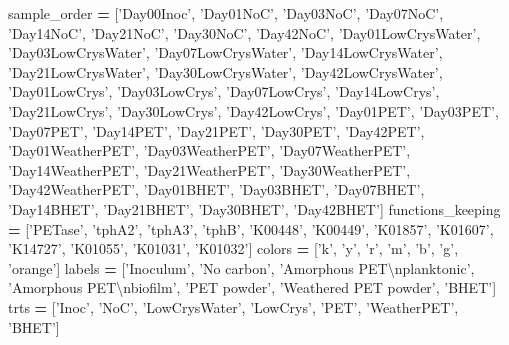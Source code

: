 \documentclass[
]{article}
\newenvironment{Shaded}{\begin{snugshade}}{\end{snugshade}}
\newcommand{\CharTok}[1]{\textcolor[rgb]{0.31,0.60,0.02}{#1}}
\newcommand{\NormalTok}[1]{#1}
\newcommand{\OperatorTok}[1]{\textcolor[rgb]{0.81,0.36,0.00}{\textbf{#1}}}
\newcommand{\StringTok}[1]{\textcolor[rgb]{0.31,0.60,0.02}{#1}}
\begin{document}
\begin{Shaded}
\begin{Highlighting}[]
\NormalTok{sample_order }\OperatorTok{=}\NormalTok{ [}\StringTok{'Day00Inoc'}\NormalTok{, }\StringTok{'Day01NoC'}\NormalTok{, }\StringTok{'Day03NoC'}\NormalTok{, }\StringTok{'Day07NoC'}\NormalTok{, }\StringTok{'Day14NoC'}\NormalTok{, }\StringTok{'Day21NoC'}\NormalTok{, }\StringTok{'Day30NoC'}\NormalTok{, }\StringTok{'Day42NoC'}\NormalTok{, }\StringTok{'Day01LowCrysWater'}\NormalTok{, }\StringTok{'Day03LowCrysWater'}\NormalTok{, }\StringTok{'Day07LowCrysWater'}\NormalTok{, }\StringTok{'Day14LowCrysWater'}\NormalTok{, }\StringTok{'Day21LowCrysWater'}\NormalTok{, }\StringTok{'Day30LowCrysWater'}\NormalTok{, }\StringTok{'Day42LowCrysWater'}\NormalTok{, }\StringTok{'Day01LowCrys'}\NormalTok{, }\StringTok{'Day03LowCrys'}\NormalTok{, }\StringTok{'Day07LowCrys'}\NormalTok{, }\StringTok{'Day14LowCrys'}\NormalTok{, }\StringTok{'Day21LowCrys'}\NormalTok{, }\StringTok{'Day30LowCrys'}\NormalTok{, }\StringTok{'Day42LowCrys'}\NormalTok{, }\StringTok{'Day01PET'}\NormalTok{, }\StringTok{'Day03PET'}\NormalTok{, }\StringTok{'Day07PET'}\NormalTok{, }\StringTok{'Day14PET'}\NormalTok{, }\StringTok{'Day21PET'}\NormalTok{, }\StringTok{'Day30PET'}\NormalTok{, }\StringTok{'Day42PET'}\NormalTok{, }\StringTok{'Day01WeatherPET'}\NormalTok{, }\StringTok{'Day03WeatherPET'}\NormalTok{, }\StringTok{'Day07WeatherPET'}\NormalTok{, }\StringTok{'Day14WeatherPET'}\NormalTok{, }\StringTok{'Day21WeatherPET'}\NormalTok{, }\StringTok{'Day30WeatherPET'}\NormalTok{, }\StringTok{'Day42WeatherPET'}\NormalTok{, }\StringTok{'Day01BHET'}\NormalTok{, }\StringTok{'Day03BHET'}\NormalTok{, }\StringTok{'Day07BHET'}\NormalTok{, }\StringTok{'Day14BHET'}\NormalTok{, }\StringTok{'Day21BHET'}\NormalTok{, }\StringTok{'Day30BHET'}\NormalTok{, }\StringTok{'Day42BHET'}\NormalTok{]}
\NormalTok{functions_keeping }\OperatorTok{=}\NormalTok{ [}\StringTok{'PETase'}\NormalTok{, }\StringTok{'tphA2'}\NormalTok{, }\StringTok{'tphA3'}\NormalTok{, }\StringTok{'tphB'}\NormalTok{, }\StringTok{'K00448'}\NormalTok{, }\StringTok{'K00449'}\NormalTok{, }\StringTok{'K01857'}\NormalTok{, }\StringTok{'K01607'}\NormalTok{, }\StringTok{'K14727'}\NormalTok{, }\StringTok{'K01055'}\NormalTok{, }\StringTok{'K01031'}\NormalTok{, }\StringTok{'K01032'}\NormalTok{]}
\NormalTok{colors }\OperatorTok{=}\NormalTok{ [}\StringTok{'k'}\NormalTok{, }\StringTok{'y'}\NormalTok{, }\StringTok{'r'}\NormalTok{, }\StringTok{'m'}\NormalTok{, }\StringTok{'b'}\NormalTok{, }\StringTok{'g'}\NormalTok{, }\StringTok{'orange'}\NormalTok{]}
\NormalTok{labels }\OperatorTok{=}\NormalTok{ [}\StringTok{'Inoculum'}\NormalTok{, }\StringTok{'No carbon'}\NormalTok{, }\StringTok{'Amorphous PET}\CharTok{\textbackslash{}n}\StringTok{planktonic'}\NormalTok{, }\StringTok{'Amorphous PET}\CharTok{\textbackslash{}n}\StringTok{biofilm'}\NormalTok{, }\StringTok{'PET powder'}\NormalTok{, }\StringTok{'Weathered PET powder'}\NormalTok{, }\StringTok{'BHET'}\NormalTok{]}
\NormalTok{trts }\OperatorTok{=}\NormalTok{ [}\StringTok{'Inoc'}\NormalTok{, }\StringTok{'NoC'}\NormalTok{, }\StringTok{'LowCrysWater'}\NormalTok{, }\StringTok{'LowCrys'}\NormalTok{, }\StringTok{'PET'}\NormalTok{, }\StringTok{'WeatherPET'}\NormalTok{, }\StringTok{'BHET'}\NormalTok{]}


\end{Highlighting}
\end{Shaded}
\end{document}
